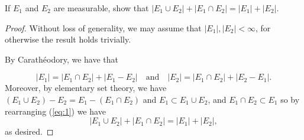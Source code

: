 \begin{problem}
If $E_1$ and $E_2$ are measurable, show that
$\left|E_1\cup E_2\right|+\left|E_1\cap
  E_2\right|=\left|E_1\right|+\left|E_2\right|$.
\end{problem}
\begin{proof}
Without loss of generality, we may assume that
$\left|E_1\right|,\left|E_2\right|<\infty$, for otherwise the result holds
trivially.

By Carathéodory, we have that

\begin{equation}
\label{eq:1}
\left|E_1\right|=\left|E_1\cap
  E_2\right|+\left|E_1\minus E_2\right|
\quad\text{and}\quad
\left|E_2\right|=\left|E_1\cap
  E_2\right|+\left|E_2\minus E_1\right|.
\end{equation}
Moreover, by elementary set theory, we have $\left(E_1\cup E_2\right)\minus
E_2=E_1\minus\left(E_1\cap E_2\right)$ and $E_1\subset E_1\cup E_2$, and
$E_1\cap E_2\subset E_1$ so by rearranging (\ref{eq:1}) we have
\[
\left|E_1\cup E_2\right|+\left|E_1\cap
  E_2\right|=\left|E_1\right|+\left|E_2\right|,
\]
as desired.
\end{proof}

